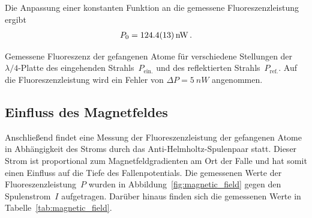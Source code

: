 \documentclass[11pt, a4paper]{article}
\numberwithin{equation}{section}
\begin{document}
Die Anpassung einer konstanten Funktion an die gemessene Fluoreszenzleistung ergibt
\begin{align*}
P_0 = \SI{124.4 +- 1.3}{nW}\,\text{.}
\end{align*}
\begin{table}[h]
	\centering
	
	\caption{Gemessene Fluoreszenz der gefangenen Atome für verschiedene Stellungen der $\lambda / 4$-Platte des eingehenden Strahls~$P_\mathrm{ein.}$ und des reflektierten Strahls~$P_\mathrm{ref.}$. Auf die Fluoreszenzleistung wird ein Fehler von $\Delta P = \SI{5}{nW}$ angenommen.}
	\label{tab:lambda_4}
\end{table}

\clearpage
\subsection{Einfluss des Magnetfeldes}
Anschließend findet eine Messung der Fluoreszenzleistung der gefangenen Atome in Abhängigkeit des Stroms durch das Anti-Helmholtz-Spulenpaar statt.
Dieser Strom ist proportional zum Magnetfeldgradienten am Ort der Falle und hat somit einen Einfluss auf die Tiefe des Fallenpotentials.
Die gemessenen Werte der Fluoreszenzleistung~$P$ wurden in Abbildung~\ref{fig:magnetic_field} gegen den Spulenstrom~$I$ aufgetragen.
Darüber hinaus finden sich die gemessenen Werte in Tabelle~\ref{tab:magnetic_field}.
\end{document}
